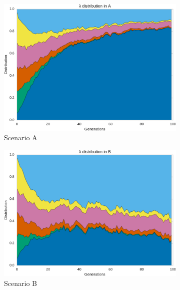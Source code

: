 \begin{figure}
\centering
\begin{subfigure}[t]{.49\columnwidth}
\centering
\includegraphics[width=\columnwidth]{fig/lambda_A}
\caption{Scenario A}
\label{fig:lambda_A}
\end{subfigure}
\begin{subfigure}[t]{.49\columnwidth}
\centering
\includegraphics[width=\columnwidth]{fig/lambda_B}
\caption{Scenario B}
\label{fig:lambda_B}
\end{subfigure}
\begin{subfigure}[t]{.49\columnwidth}
\centering

\end{subfigure}
\end{figure}
